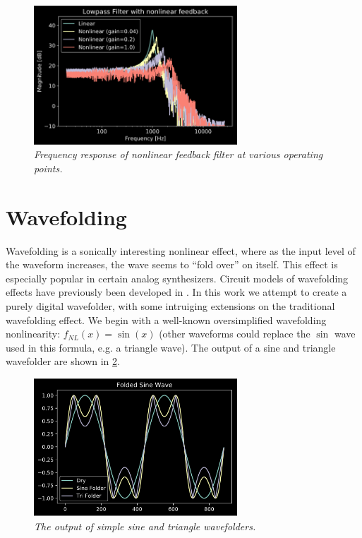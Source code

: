 \documentclass[twoside,a4paper]{article}
\begin{document}
%
\begin{figure}[h]
    \center
    \includegraphics[width=3in]{../NonlinearFeedback/Pics/LPF-NL.png}
    \caption{\label{nlfd-lpf}{\it Frequency response of nonlinear feedback filter at
    various operating points.}}
\end{figure}
%

\section{Wavefolding} \label{sec:wavefold}
%
Wavefolding is a sonically interesting nonlinear effect, where
as the input level of the waveform increases, the wave seems to
``fold over'' on itself. This effect is especially popular in
certain analog synthesizers. Circuit models of wavefolding effects
have previously been developed in \cite{DAFX-wavefold,appl_sci-wavefold}.
In this work we attempt to create a purely digital wavefolder, with
some intruiging extensions on the traditional wavefolding effect.
\newline\newline
We begin with a well-known oversimplified wavefolding nonlinearity:
$f_{NL}(x) = \sin(x)$ (other waveforms could replace the $\sin$ wave
used in this formula, e.g. a triangle wave). The output of a sine
and triangle wavefolder are shown in \cref{simple_fold}.
%
\begin{figure}[h]
    \center
    \includegraphics[width=3in]{../Wavefolder/Pics/simple_fold.png}
    \caption{\label{simple_fold}{\it The output of simple sine and triangle wavefolders.}}
\end{figure}
%
\end{document}
